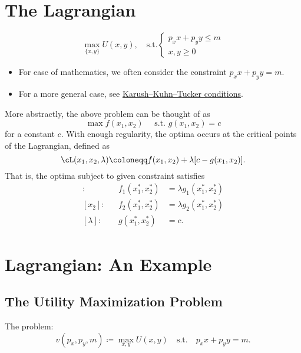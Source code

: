 \documentclass[oneside,reqno,letterpaper]{amsart}
\begin{document}
\section{The Lagrangian}
\begin{example}
  \[
    \max_{\{x, y\}} U(x, y), \quad \text{s.t.} 
    \begin{cases}
      p_x x + p_y y \leq m \\ 
      x, y \geq 0
    \end{cases}
  \]
  \begin{itemize}
    \item For ease of mathematics, we often consider the constraint \(p_x x + p_y y = m\). 
    \item For a more general case, see \href{https://en.wikipedia.org/wiki/Karush%E2%80%93Kuhn%E2%80%93Tucker_conditions}{Karush–Kuhn–Tucker conditions}. 
  \end{itemize}
\end{example}


\begin{theorem}
  More abstractly, the above problem can be thought of as 
  \[
    \max f(x_1, x_2) \quad \text{ s.t. } g(x_1, x_2) = c 
  \] 
  for a constant \(c\). 
  With enough regularity, the optima occurs at the critical points of the Lagrangian, defined as 
  \[
    \cL(x_1, x_2, \lambda)
    \coloneqq f(x_1, x_2) + \lambda [c - g(x_1, x_2)] . 
  \] 
  That is, the optima subject to given constraint satisfies 
  \begin{align*}
    [x_1]: && f_1(x_1^*, x_2^*) &= \lambda g_1(x_1^*, x_2^*) \\ 
    [x_2]: && f_2(x_1^*, x_2^*) &= \lambda g_2(x_1^*, x_2^*) \\ 
    [\lambda]: && g(x_1^*, x_2^*) &= c . 
  \end{align*}
\end{theorem}

\section{Lagrangian: An Example}
\subsection{The Utility Maximization Problem}
The problem:
\[
  v(p_x, p_y, m) \coloneqq
  \max_{x, y} U(x, y) \quad \text{s.t.} \quad p_x x + p_y y = m . 
\] 
\end{document}
